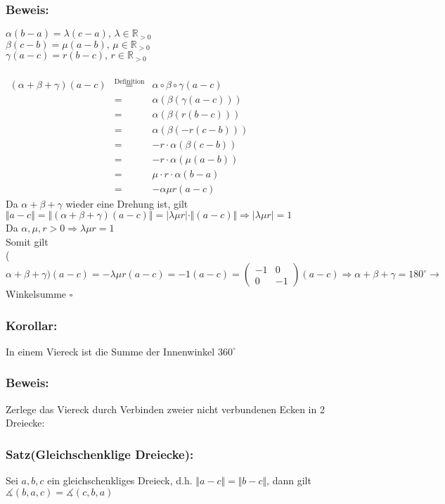 \subsubsection{Beweis:}
$\alpha(b-a)=\lambda(c-a), \, \lambda \in \mathbb{R}_{>0}$\\
$\beta(c-b)=\mu(a-b), \, \mu \in \mathbb{R}_{>0}$\\
$\gamma(a-c)= r(b-c), \, r \in \mathbb{R}_{>0}$\\
\qquad\\
$
\begin{array}{rcr}
(\alpha + \beta + \gamma)(a-c) &\mathop{=}\limits^{\text{Definition}}& \alpha \circ \beta \circ \gamma(a-c)\\
 &=&  \alpha (\beta(\gamma(a-c)))\\
 &=& \alpha(\beta(r(b-c)))\\
 &=& \alpha (\beta(-r(c-b)))\\
 &=& -r \cdot \alpha(\beta(c-b))\\
 &=& -r\cdot \alpha(\mu(a-b))\\
 &=& \mu \cdot r \cdot \alpha (b-a)\\
 &=& -\alpha \mu r (a-c)
\end{array} 
$\\
Da $\alpha + \beta + \gamma$ wieder eine Drehung ist, gilt $\Vert a-c\Vert = \Vert (\alpha + \beta + \gamma)(a-c)\Vert=\vert\lambda \mu r\vert \cdot \Vert (a-c)\Vert \Rightarrow \vert \lambda \mu r\vert=1$\\
Da $\alpha, \mu, r > 0 \Rightarrow \lambda\mu r = 1$\\
Somit gilt \\
($\alpha+\beta+\gamma)(a-c)=-\lambda \mu r (a-c) = -1(a-c)=\begin{pmatrix} -1 & 0 \\ 0 & -1\end{pmatrix}(a-c) \Rightarrow \alpha + \beta + \gamma=180^{\circ} \rightarrow$ Winkelsumme $\square$
%
%
%
\subsubsection{Korollar:}
In einem Viereck ist die Summe der Innenwinkel $360^{\circ}$
%
%
%
\subsubsection{Beweis:}
Zerlege das Viereck durch Verbinden zweier nicht verbundenen Ecken in 2 Dreiecke:
%
%
%
%
\subsubsection{Satz(Gleichschenklige Dreiecke):}
Sei $a,b,c$ ein gleichschenkliges Dreieck, d.h. $\Vert a-c \Vert = \Vert b-c \Vert$, dann gilt $\measuredangle (b,a,c) = \measuredangle (c,b,a)$
%
%
%
%

